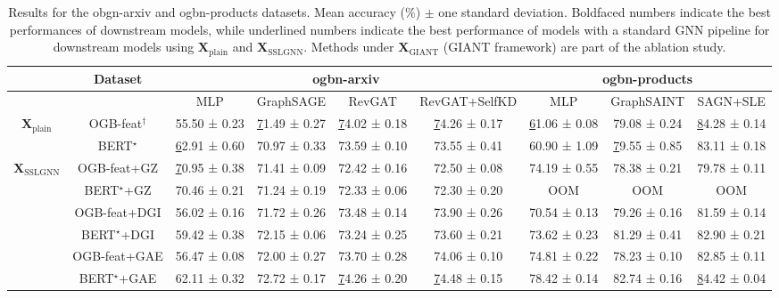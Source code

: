 \documentclass{article} %
\begin{document}
\begin{table}[t!]
\caption{Results for the obgn-arxiv and ogbn-products datasets. Mean accuracy ($\%$) $\pm$ one standard deviation. Boldfaced numbers indicate the best performances of downstream models, while underlined numbers indicate the best performance of models with a standard GNN pipeline for downstream models using $\mathbf{X}_{\text{plain}}$ and $\mathbf{X}_{\text{SSLGNN}}$. Methods under $\mathbf{X}_{\text{GIANT}}$ (GIANT framework) are part of the ablation study.
}
\vspace{0.1cm}
\centering
\setlength{\tabcolsep}{2.5pt}
\label{tab:ogbn-arxiv}
\scriptsize
\begin{tabular}{@{}cccccc|ccc@{}}
\toprule
\multicolumn{1}{l}{} &
  Dataset &
  \multicolumn{4}{c|}{ogbn-arxiv} &
  \multicolumn{3}{c}{ogbn-products} \\ \midrule
\multicolumn{1}{l}{} &
   &
  MLP &
  GraphSAGE &
  RevGAT &
  RevGAT+SelfKD &
  MLP &
  GraphSAINT &
  SAGN+SLE \\ \midrule
\multirow{2}{*}{$\mathbf{X}_{\text{plain}}$} &
  OGB-feat$^\dagger$ &
  55.50 ± 0.23 &
  {\ul 71.49 ± 0.27 } &
  {\ul 74.02 ± 0.18} &
  {\ul 74.26 ± 0.17} &
  {\ul 61.06 ± 0.08} &
  79.08 ± 0.24 &
  {\ul 84.28 ± 0.14} \\
 &
  BERT$^\star$ &
  {\ul 62.91 ± 0.60} &
  70.97 ± 0.33 &
  73.59 ± 0.10 &
  73.55 ± 0.41 &
  60.90 ± 1.09 &
  {\ul 79.55 ± 0.85} &
  83.11 ± 0.18 \\ \midrule
\multirow{8}{*}{$\mathbf{X}_{\text{SSLGNN}}$} &
  OGB-feat+GZ &
  {\ul 70.95 ± 0.38} &
  71.41 ± 0.09 &
  72.42 ± 0.16 &
  72.50 ± 0.08 &
  74.19 ± 0.55 &
  78.38 ± 0.21 &
  79.78 ± 0.11 \\
 &
  BERT$^\star$+GZ &
  70.46 ± 0.21 &
  71.24 ± 0.19 &
  72.33 ± 0.06 &
  72.30 ± 0.20 &
  OOM &
  OOM &
  OOM \\
 &
  OGB-feat+DGI &
  56.02 ± 0.16 &
  71.72 ± 0.26 &
  73.48 ± 0.14 &
  73.90 ± 0.26 &
  70.54 ± 0.13 &
  79.26 ± 0.16 &
  81.59 ± 0.14 \\
 &
  BERT$^\star$+DGI &
  59.42 ± 0.38 &
  72.15 ± 0.06 &
  73.24 ± 0.25 &
  73.60 ± 0.21 &
  73.62 ± 0.23 &
  81.29 ± 0.41 &
  82.90 ± 0.21 \\
 &
  OGB-feat+GAE &
  56.47 ± 0.08 &
  72.00 ± 0.27 &
  73.70 ± 0.28 &
  74.06 ± 0.10 &
  74.81 ± 0.22 &
  78.23 ± 0.10 &
  82.85 ± 0.11 \\
 &
  BERT$^\star$+GAE &
  62.11 ± 0.32 &
  72.72 ± 0.17 &
  {\ul 74.26 ± 0.20} &
  {\ul 74.48 ± 0.15} &
  78.42 ± 0.14 &
  82.74 ± 0.16 &
  {\ul 84.42 ± 0.04} \\

\end{tabular}
\end{table}
\end{document}
